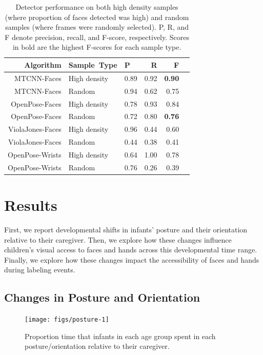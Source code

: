 \documentclass[10pt, letterpaper]{article}
\newenvironment{CodeChunk}{}{}
\begin{document}
\begin{table}[ht]
\centering
\begin{tabular}{rllrrr}
  \hline
   Algorithm & Sample\ Type & P & R & F \\ 
  \hline
  MTCNN-Faces & High density & 0.89 & 0.92 & \textbf{0.90} \\ 
  MTCNN-Faces & Random & 0.94 & 0.62 & 0.75 \\ 
  OpenPose-Faces & High density & 0.78 & 0.93 & 0.84 \\ 
  OpenPose-Faces & Random & 0.72 & 0.80 & \textbf{0.76} \\ 
  ViolaJones-Faces & High density & 0.96 & 0.44 & 0.60 \\ 
  ViolaJones-Faces & Random & 0.44 & 0.38 & 0.41 \\ 
  OpenPose-Wrists & High density & 0.64 & 1.00 & 0.78 \\ 
  OpenPose-Wrists & Random & 0.76 & 0.26 & 0.39 \\ 
   \hline
\end{tabular}
\caption{Detector performance on both high density samples (where proportion of faces detected was high) and random samples (where frames were randomly selected). P, R, and F denote precision, recall, and F-score, respectively. Scores in bold are the highest F-scores for each sample type.} 
\end{table}

\section{Results}\label{results}

First, we report developmental shifts in infants' posture and their
orientation relative to their caregiver. Then, we explore how these
changes influence children's visual access to faces and hands across
this developmental time range. Finally, we explore how these changes
impact the accessibility of faces and hands during labeling events.

\subsection{Changes in Posture and
Orientation}\label{changes-in-posture-and-orientation}

\begin{CodeChunk}
\begin{figure}[h]

{\centering \texttt{[image: figs/posture-1]} 

}

\caption[Proportion time that infants in each age group spent in each posture/orientation relative to their caregiver]{Proportion time that infants in each age group spent in each posture/orientation relative to their caregiver.}\label{fig:posture}
\end{figure}
\end{CodeChunk}
\end{document}
